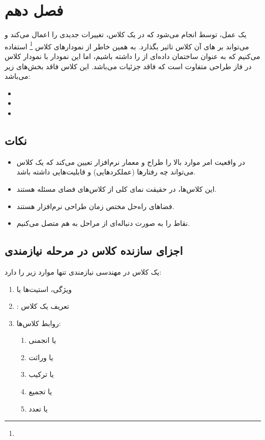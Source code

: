 \newpage

\section{فصل دهم}

یک عمل، توسط  انجام می‌شود که در یک کلاس، تغییرات جدیدی را اعمال
می‌کند و می‌تواند بر های آن کلاس تاثیر بگذارد. به همین خاطر از
نمودار‌های کلاس \footnote{} استفاده می‌کنیم که به عنوان
ساختمان داده‌ای از  را داشته باشیم، اما این نمودار با نمودار کلاس در
فاز طراحی متفاوت است که فاقد جزئیات می‌باشد. این کلاس فاقد بخش‌های زیر می‌باشد:

\begin{LTR}
    \begin{itemize}
        \item {}
        \item {}
        \item {}
    \end{itemize}
\end{LTR}

\subsection*{نکات}

\begin{itemize} 
    \item در واقعیت امر موارد بالا را طراح و معمار نرم‌افزار تعیین می‌کند که یک
    کلاس می‌تواند چه رفتار‌ها (عملکرد‌هایی) و قابلیت‌هایی داشته باشد.
    \item این کلاس‌ها، در حقیقت نمای کلی از کلاس‌های فضای مسئله هستند.
    \item فضا‌های راه‌حل مختص زمان طراحی نرم‌افزار هستند.
    \item نقاط را به صورت دنباله‌ای از مراحل به هم متصل می‌کنیم.
\end{itemize}

\subsection{اجزای سازنده کلاس در مرحله نیازمندی}

یک کلاس در مهندسی نیازمندی تنها موارد زیر را دارد:

\begin{enumerate}
    \item ویژگی، استیت‌ها یا 
    \item {}: تعریف یک کلاس
    \item روابط کلاس‌ها:
    \begin{enumerate}
        \item {} یا انجمنی
        \item {} یا وراثت
        \item {} یا ترکیب
        \item {} یا تجمیع
        \item {} یا تعدد
    \end{enumerate}
\end{enumerate}

